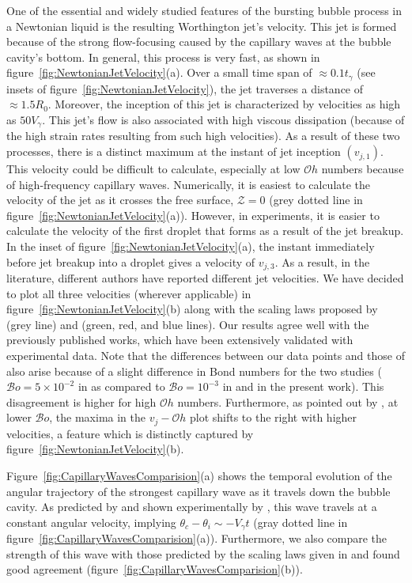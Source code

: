 \documentclass[final]{jfm}
\begin{document}
One of the essential and widely studied features of the bursting bubble process in a Newtonian liquid is the resulting Worthington jet's velocity. This jet is formed because of the strong flow-focusing caused by the capillary waves at the bubble cavity's bottom. In general, this process is very fast, as shown in figure~\ref{fig:NewtonianJetVelocity}(a). Over a small time span of $\approx 0.1t_\gamma$ (see insets of figure~\ref{fig:NewtonianJetVelocity}), the jet traverses a distance of $\approx 1.5R_0$. Moreover, the inception of this jet is characterized by velocities as high as $50V_\gamma$.  This jet's flow is also associated with high viscous dissipation (because of the high strain rates resulting from such high velocities). As a result of these two processes, there is a distinct maximum at the instant of jet inception  $\left(v_{j,1}\right)$. This velocity could be difficult to calculate, especially at low $\mathcal{O}h$ numbers because of high-frequency capillary waves. Numerically, it is easiest to calculate the velocity of the jet as it crosses the free surface, $\mathcal{Z} = 0$ (grey dotted line in figure~\ref{fig:NewtonianJetVelocity}(a)). However, in experiments, it is easier to calculate the velocity of the first droplet that forms as a result of the jet breakup. In the inset of figure~\ref{fig:NewtonianJetVelocity}(a), the instant immediately before jet breakup into a droplet gives a velocity of $v_{j,3}$. As a result, in the literature, different authors have reported different jet velocities. We have decided to plot all three velocities (wherever applicable) in figure~\ref{fig:NewtonianJetVelocity}(b) along with the scaling laws proposed by \citet{deike2018dynamics} (grey line) and \citet{gordillo2019capillary} (green, red, and blue lines). Our results agree well with the previously published works, which have been extensively validated with experimental data. Note that the differences between our data points and those of \citet{gordillo2019capillary} also arise because of a slight difference in Bond numbers for the two studies ($\mathcal{B}o = 5\times 10^{-2}$ in \citet{gordillo2019capillary} as compared to $\mathcal{B}o = 10^{-3}$ in \cite{deike2018dynamics} and in the present work). This disagreement is higher for high $\mathcal{O}h$ numbers. Furthermore, as pointed out by \citet{deike2018dynamics}, at lower $\mathcal{B}o$, the maxima in the $v_j - \mathcal{O}h$ plot shifts to the right with higher velocities, a feature which is distinctly captured by figure~\ref{fig:NewtonianJetVelocity}(b).

Figure~\ref{fig:CapillaryWavesComparision}(a) shows the temporal evolution of the angular trajectory of the strongest capillary wave as it travels down the bubble cavity. As predicted by \citet{gordillo2019capillary} and shown experimentally by \citet{krishnan2017scaling}, this wave travels at a constant angular velocity, implying $\theta_c - \theta_i \sim -V_\gamma t$ (gray dotted line in figure~\ref{fig:CapillaryWavesComparision}(a)). Furthermore, we also compare the strength of this wave with those predicted by the scaling laws given in \citet{gordillo2019capillary} and found good agreement (figure~\ref{fig:CapillaryWavesComparision}(b)).  
\end{document}
